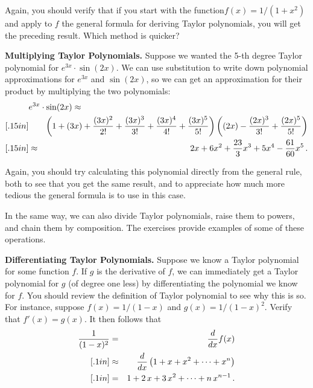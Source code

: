 {{{{Again, you should verify that if you start with the function$f(x)=1/(1+x^2)$ and apply to $f$ the general formula for deriving Taylor polynomials, you will get the preceding result.  Which method is quicker?
 
\medskip



{\bf Multiplying Taylor Polynomials.}  Suppose we wanted the 5-th degree Taylor polynomial for $e^{3x}\cdot \sin(2x)$.  We can use substitution to write down polynomial approximations for $e^{3x}$ and $\sin(2x)$, so we can get an approximation for their product by multiplying the two polynomials:
\begin{eqnarray*}
\lefteqn{e^{3x} \cdot \sin(2x) \approx} \\ [.15in]
& &{\displaystyle\left(1+(3x)+{(3x)^2 \over 2!}+{(3x)^3 \over 3!} +{(3x)^4 \over 4!}+{(3x)^5 \over 5!}\right)\left((2x)-{(2x)^3 \over 3!} +{(2x)^5 \over 5!}\right)} \\ [.15in]
&\approx&{\displaystyle 2x+6x^2+{23 \over 3}x^3+5x^4-{61 \over 60}x^5} \,.
\end{eqnarray*}

Again, you should try calculating this polynomial directly from the general rule, both to see that you get the same result, and to appreciate how much more tedious the general formula is to use in this case.

In the same way, we can also divide Taylor polynomials, raise them to powers, and chain them by composition. The exercises provide examples of some of these operations.

\medskip



{\bf Differentiating Taylor Polynomials.}  Suppose we know a Taylor polynomial for some function $f$. If $g$ is the derivative of $f$, we can immediately get a Taylor polynomial for $g$ (of degree one less) by differentiating the polynomial we know for $f$. You should review the definition of Taylor polynomial to see why this is so.  For instance, suppose $f(x) = 1/(1-x)$ and $g(x) =1/(1-x)^2 $.  Verify that $f'(x) = g(x)$. It then follows that
\begin{eqnarray*}
{\displaystyle 1 \over (1-x)^2 } & = & \frac{d}{dx} f(x) \\ [.1in]
        & \approx & \frac{d}{dx} \left( 1+x+x^2 + \cdots + x^n \right) \\ [.1in]
        &=&1+2\,x+3\,x^2+\cdots + n\,x^{n-1} \,.
\end{eqnarray*} 

}}}}
